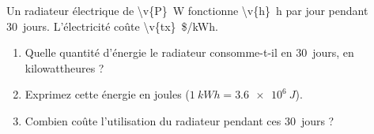 Un radiateur électrique de \qty{\v{P}}{W} fonctionne \qty{\v{h}}{h} par jour pendant \qty{30}{jours}. L'électricité coûte \qty[minimum-decimal-digits=2]{\v{tx}}{\$/kWh}.

\begin{enumerate}[label=\alph*)]
    \item Quelle quantité d'énergie le radiateur consomme-t-il en \qty{30}{jours}, en kilowattheures ?
    \item Exprimez cette énergie en joules ($\qty{1}{kWh} = \qty{3.6e6}{J}$).
    \item Combien coûte l'utilisation du radiateur pendant ces \qty{30}{jours} ?
\end{enumerate}
